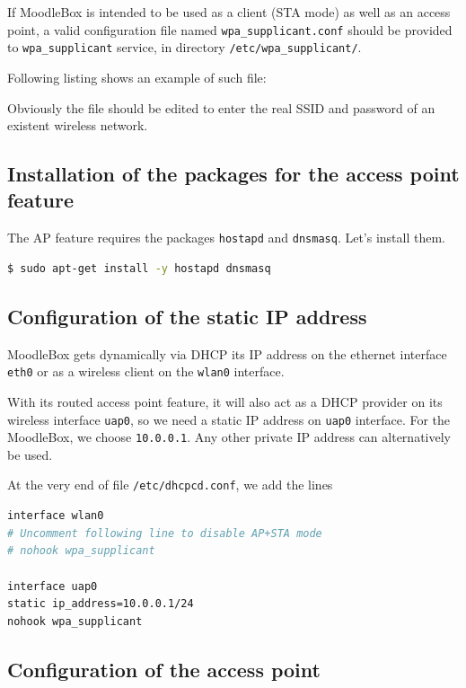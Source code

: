 \documentclass[12pt]{article}
\begin{document}
If MoodleBox is intended to be used as a client (STA mode) as well as an access point, a valid configuration file named \lstinline{wpa_supplicant.conf} should be provided to \lstinline{wpa_supplicant} service, in directory \lstinline{/etc/wpa_supplicant/}.

Following listing shows an example of such file:


Obviously the file should be edited to enter the real SSID and password of an existent wireless network.

\subsection{Installation of the packages for the access point feature}

The AP feature requires the packages \lstinline{hostapd} and \lstinline{dnsmasq}.
Let's install them.
\begin{lstlisting}[language=bash]
$ sudo apt-get install -y hostapd dnsmasq
\end{lstlisting}

\subsection{Configuration of the static IP address}\label{ssec-static-ip}

MoodleBox gets dynamically via DHCP its IP address on the ethernet interface \lstinline{eth0} or as a wireless client on the \lstinline{wlan0} interface.

With its routed access point feature, it will also act as a DHCP provider on its wireless interface \lstinline{uap0}, so we need a static IP address on \lstinline{uap0} interface. For the MoodleBox, we choose \lstinline{10.0.0.1}.
Any other private IP address can alternatively be used.

At the very end of file \lstinline{/etc/dhcpcd.conf}, we add the lines
\begin{lstlisting}[language=bash]
interface wlan0
# Uncomment following line to disable AP+STA mode
# nohook wpa_supplicant

interface uap0
static ip_address=10.0.0.1/24
nohook wpa_supplicant
\end{lstlisting}

\subsection{Configuration of the access point}
\end{document}
